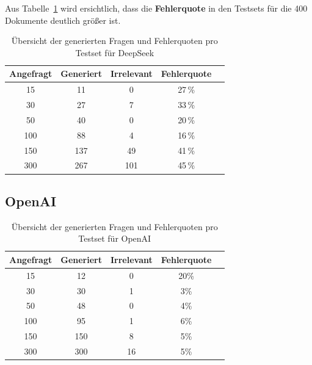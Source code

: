 Aus Tabelle~\ref{tab:deepseek_questions_overview} wird ersichtlich, dass die \textbf{Fehlerquote} in den Testsets für die 400 Dokumente deutlich größer ist.

\begin{table}[htbp]
    \centering
    \caption[DeepSeek Übersicht Fehlerquote für Fragen]{Übersicht der generierten Fragen und Fehlerquoten pro Testset für DeepSeek}
    \begin{tabular}{|c|c|c|c|c|}
        \hline
        \textbf{Angefragt} & \textbf{Generiert} & \textbf{Irrelevant} & \textbf{Fehlerquote} \\
        \hline
        15   & 11  & 0   & 27\,\% \\
        30   & 27  & 7   & 33\,\% \\
        50   & 40  & 0   & 20\,\% \\
        100  & 88  & 4   & 16\,\% \\
        150  & 137 & 49  & 41\,\% \\
        300  & 267 & 101 & 45\,\% \\
        \hline
    \end{tabular}
    \label{tab:deepseek_questions_overview}
\end{table}

\subsection{OpenAI}

\begin{table}[htbp]
    \centering
    \caption[OpenAI Übersicht Fehlerquote für Fragen]{Übersicht der generierten Fragen und Fehlerquoten pro Testset für OpenAI}
    \begin{tabular}{|c|c|c|c|c|}
        \hline
        \textbf{Angefragt} & \textbf{Generiert} & \textbf{Irrelevant} & \textbf{Fehlerquote} \\
        \hline
        15   & 12   & 0   & 20\% \\
        30   & 30   & 1   & 3\%  \\
        50   & 48   & 0   & 4\%  \\
        100  & 95   & 1   & 6\%  \\
        150  & 150  & 8   & 5\%  \\
        300  & 300  & 16  & 5\%  \\
        \hline
    \end{tabular}
    \label{tab:openai_questions_overview}
\end{table}

